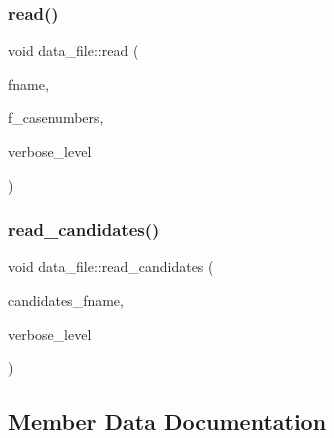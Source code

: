 \mbox{\label{classdata__file_a34c1f9447c977e2e98958930853afaf0}} 
\subsubsection{\texorpdfstring{read()}{read()}}
{\footnotesize\ttfamily void data\+\_\+file\+::read (\begin{DoxyParamCaption}\item[{const \mbox{\hyperlink{galois_8h_ab6cc7b4aeb6ea31aba2b3fbfc83ff5e6}{B\+Y\+TE}} $\ast$}]{fname,  }\item[{\mbox{\hyperlink{galois_8h_a09fddde158a3a20bd2dcadb609de11dc}{I\+NT}}}]{f\+\_\+casenumbers,  }\item[{\mbox{\hyperlink{galois_8h_a09fddde158a3a20bd2dcadb609de11dc}{I\+NT}}}]{verbose\+\_\+level }\end{DoxyParamCaption})}

\mbox{\label{classdata__file_acf077d7faac5b228bd88ce8dae0dda3b}} 
\subsubsection{\texorpdfstring{read\+\_\+candidates()}{read\_candidates()}}
{\footnotesize\ttfamily void data\+\_\+file\+::read\+\_\+candidates (\begin{DoxyParamCaption}\item[{const \mbox{\hyperlink{galois_8h_ab6cc7b4aeb6ea31aba2b3fbfc83ff5e6}{B\+Y\+TE}} $\ast$}]{candidates\+\_\+fname,  }\item[{\mbox{\hyperlink{galois_8h_a09fddde158a3a20bd2dcadb609de11dc}{I\+NT}}}]{verbose\+\_\+level }\end{DoxyParamCaption})}



\subsection{Member Data Documentation}
\mbox{\label{classdata__file_a64d241eae5a2da949672c81e216e0a04}} 
